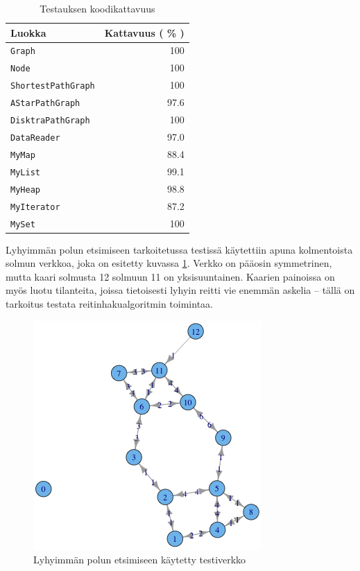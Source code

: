 \documentclass[10pt,a4paper]{article}
\begin{document}
\begin{table}
\begin{tabular}{l|r}
Luokka & Kattavuus ( \% ) \\ 
\hline 
\texttt{Graph} & 100 \\ 
\texttt{Node} & 100 \\ 
\texttt{ShortestPathGraph} & 100 \\
\texttt{AStarPathGraph} & 97.6 \\
\texttt{DisktraPathGraph} & 100 \\
\hline
\texttt{DataReader} & 97.0 \\
\hline 
\texttt{MyMap} & 88.4 \\
\texttt{MyList} & 99.1 \\
\texttt{MyHeap} & 98.8 \\
\texttt{MyIterator} & 87.2 \\
\texttt{MySet} & 100 \\
\end{tabular} 
\caption{Testauksen koodikattavuus}
\label{cov}
\end{table}

Lyhyimmän polun etsimiseen tarkoitetussa testissä käytettiin apuna kolmentoista solmun verkkoa, joka on esitetty kuvassa \ref{testiverkko}. Verkko on pääosin symmetrinen, mutta kaari solmusta 12 solmuun 11 on yksisuuntainen. Kaarien painoissa on myös luotu tilanteita, joissa tietoisesti lyhyin reitti vie enemmän askelia -- tällä on tarkoitus testata reitinhakualgoritmin toimintaa.

\begin{figure}
\includegraphics[scale=.5]{test_network.png} 
\caption{Lyhyimmän polun etsimiseen käytetty testiverkko}
\label{testiverkko}
\end{figure}
\end{document}

